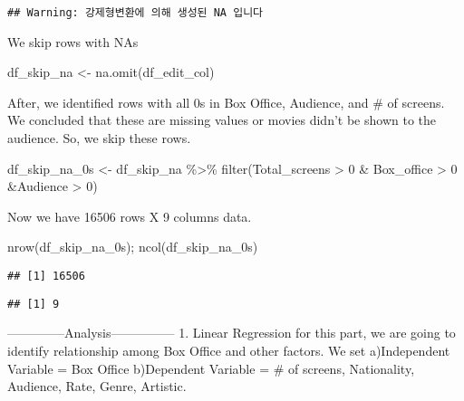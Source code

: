 \documentclass[
]{article}
\newenvironment{Shaded}{\begin{snugshade}}{\end{snugshade}}
\newcommand{\DecValTok}[1]{\textcolor[rgb]{0.00,0.00,0.81}{#1}}
\newcommand{\FunctionTok}[1]{\textcolor[rgb]{0.00,0.00,0.00}{#1}}
\newcommand{\NormalTok}[1]{#1}
\newcommand{\OtherTok}[1]{\textcolor[rgb]{0.56,0.35,0.01}{#1}}
\newcommand{\SpecialCharTok}[1]{\textcolor[rgb]{0.00,0.00,0.00}{#1}}
\begin{document}
\begin{verbatim}
## Warning: 강제형변환에 의해 생성된 NA 입니다
\end{verbatim}

We skip rows with NAs

\begin{Shaded}
\begin{Highlighting}[]
\NormalTok{df\_skip\_na }\OtherTok{\textless{}{-}} \FunctionTok{na.omit}\NormalTok{(df\_edit\_col)}
\end{Highlighting}
\end{Shaded}

After, we identified rows with all 0s in Box Office, Audience, and \# of
screens. We concluded that these are missing values or movies didn't be
shown to the audience. So, we skip these rows.

\begin{Shaded}
\begin{Highlighting}[]
\NormalTok{df\_skip\_na\_0s }\OtherTok{\textless{}{-}}\NormalTok{ df\_skip\_na }\SpecialCharTok{\%\textgreater{}\%}
  \FunctionTok{filter}\NormalTok{(Total\_screens }\SpecialCharTok{\textgreater{}} \DecValTok{0} \SpecialCharTok{\&}\NormalTok{ Box\_office }\SpecialCharTok{\textgreater{}} \DecValTok{0} \SpecialCharTok{\&}\NormalTok{Audience }\SpecialCharTok{\textgreater{}} \DecValTok{0}\NormalTok{)}
\end{Highlighting}
\end{Shaded}

Now we have 16506 rows X 9 columns data.

\begin{Shaded}
\begin{Highlighting}[]
\FunctionTok{nrow}\NormalTok{(df\_skip\_na\_0s); }\FunctionTok{ncol}\NormalTok{(df\_skip\_na\_0s)}
\end{Highlighting}
\end{Shaded}

\begin{verbatim}
## [1] 16506
\end{verbatim}

\begin{verbatim}
## [1] 9
\end{verbatim}

--------------Analysis--------------- 1. Linear Regression for this
part, we are going to identify relationship among Box Office and other
factors. We set a)Independent Variable = Box Office b)Dependent Variable
= \# of screens, Nationality, Audience, Rate, Genre, Artistic.
\end{document}
